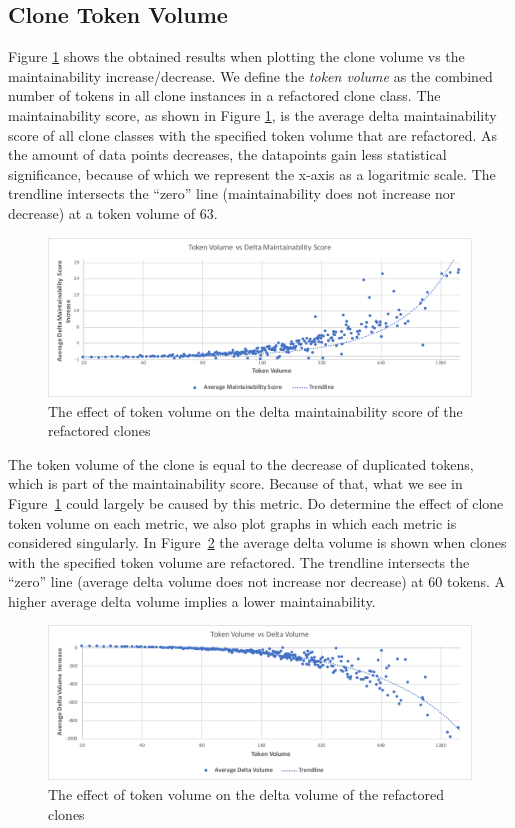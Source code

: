 \subsection{Clone Token Volume}
Figure \ref{fig:maintainabilityscore} shows the obtained results when plotting the clone volume vs the maintainability increase/decrease. We define the \textit{token volume} as the combined number of tokens in all clone instances in a refactored clone class. The maintainability score, as shown in Figure \ref{fig:maintainabilityscore}, is the average delta maintainability score of all clone classes with the specified token volume that are refactored. As the amount of data points decreases, the datapoints gain less statistical significance, because of which we represent the x-axis as a logaritmic scale.%
The trendline intersects the ``zero'' line (maintainability does not increase nor decrease) at a token volume of 63.

\begin{figure}[H]
  \includegraphics[width=1\textwidth]{img/maintainabilityscore}
  \caption{The effect of token volume on the delta maintainability score of the refactored clones}
  \label{fig:maintainabilityscore}
\end{figure}

The token volume of the clone is equal to the decrease of duplicated tokens, which is part of the maintainability score. Because of that, what we see in Figure~\ref{fig:maintainabilityscore} could largely be caused by this metric. Do determine the effect of clone token volume on each metric, we also plot graphs in which each metric is considered singularly. In Figure~\ref{fig:volume} the average delta volume is shown when clones with the specified token volume are refactored. The trendline intersects the ``zero'' line (average delta volume does not increase nor decrease) at 60 tokens. A higher average delta volume implies a lower maintainability.

\begin{figure}[H]
  \includegraphics[width=1\textwidth]{img/volume}
  \caption{The effect of token volume on the delta volume of the refactored clones}
  \label{fig:volume}
\end{figure}

